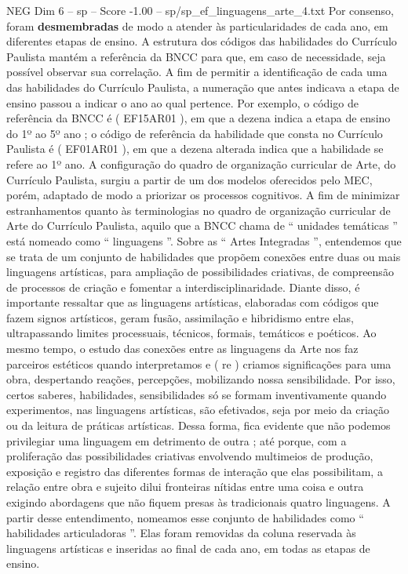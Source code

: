 \begin{textsample}{NEG Dim 6 – sp – Score -1.00 – sp/sp\_ef\_linguagens\_arte\_4.txt}
Por consenso, foram \textbf{desmembradas} de modo a atender às particularidades de cada ano, em diferentes etapas de ensino.
A estrutura dos códigos das habilidades do Currículo Paulista mantém a referência da BNCC para que, em caso de necessidade, seja possível observar sua correlação.
A fim de permitir a identificação de cada uma das habilidades do Currículo Paulista, a numeração que antes indicava a etapa de ensino passou a indicar o ano ao qual pertence.
Por exemplo, o código de referência da BNCC é ( EF15AR01 ), em que a dezena indica a etapa de ensino do 1º ao 5º ano ; o código de referência da habilidade que consta no Currículo Paulista é ( EF01AR01 ), em que a dezena alterada indica que a habilidade se refere ao 1º ano.
A configuração do quadro de organização curricular de Arte, do Currículo Paulista, surgiu a partir de um dos modelos oferecidos pelo MEC, porém, adaptado de modo a priorizar os processos cognitivos.
A fim de minimizar estranhamentos quanto às terminologias no quadro de organização curricular de Arte do Currículo Paulista, aquilo que a BNCC chama de “ unidades temáticas ” está nomeado como “ linguagens ”.
Sobre as “ Artes Integradas ”, entendemos que se trata de um conjunto de habilidades que propõem conexões entre duas ou mais linguagens artísticas, para ampliação de possibilidades criativas, de compreensão de processos de criação e fomentar a interdisciplinaridade.
Diante disso, é importante ressaltar que as linguagens artísticas, elaboradas com códigos que fazem signos artísticos, geram fusão, assimilação e hibridismo entre elas, ultrapassando limites processuais, técnicos, formais, temáticos e poéticos.
Ao mesmo tempo, o estudo das conexões entre as linguagens da Arte nos faz parceiros estéticos quando interpretamos e ( re ) criamos significações para uma obra, despertando reações, percepções, mobilizando nossa sensibilidade.
Por isso, certos saberes, habilidades, sensibilidades só se formam inventivamente quando experimentos, nas linguagens artísticas, são efetivados, seja por meio da criação ou da leitura de práticas artísticas.
Dessa forma, fica evidente que não podemos privilegiar uma linguagem em detrimento de outra ; até porque, com a proliferação das possibilidades criativas envolvendo multimeios de produção, exposição e registro das diferentes formas de interação que elas possibilitam, a relação entre obra e sujeito dilui fronteiras nítidas entre uma coisa e outra exigindo abordagens que não fiquem presas às tradicionais quatro linguagens.
A partir desse entendimento, nomeamos esse conjunto de habilidades como “ habilidades articuladoras ”.
Elas foram removidas da coluna reservada às linguagens artísticas e inseridas ao final de cada ano, em todas as etapas de ensino.

\end{textsample}
